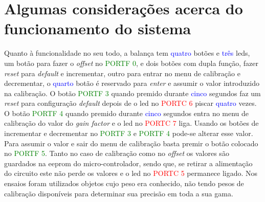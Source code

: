 \section{Algumas considerações acerca do funcionamento do sistema}
Quanto à funcionalidade no seu todo, a balança tem \textcolor{blue}{quatro} botões e \textcolor{blue}{três} \acsp{led}, um botão para fazer o \textit{offset} no \textcolor{green}{PORTF 0}, e dois botões com dupla função, fazer \textit{reset} para \textit{default} e incrementar, outro para entrar no menu de calibração e decrementar, o \textcolor{blue}{quarto} botão é reservado para \textit{enter} e assumir o valor introduzido na calibração.
\emptyline
O botão \textcolor{green}{PORTF 3} quando premido durante \textcolor{blue}{cinco} segundos faz um \textit{reset} para configuração \textit{default} depois de o \acs{led} no \textcolor{red}{PORTC 6} piscar \textcolor{blue}{quatro} vezes.
\emptyline
O botão \textcolor{green}{PORTF 4} quando premido durante \textcolor{blue}{cinco} segundos entra no menu de calibração do valor do \textit{gain factor} e o \acs{led} no \textcolor{red}{PORTC 7} liga. Usando os botões de incrementar e decrementar no
\textcolor{green}{PORTF 3} e \textcolor{green}{PORTF 4} pode-se alterar esse valor.
\emptyline
Para assumir o valor e sair do menu de calibração basta premir o botão colocado no \textcolor{green}{PORTF 5}. Tanto no caso de calibração como no \textit{offset} os valores são guardados na \acs{eeprom} do micro-controlador, sendo que, se retirar a alimentação do circuito este não perde os valores e o \acs{led} no \textcolor{red}{PORTC 5} permanece ligado.
\emptyline
Nos ensaios foram utilizados objetos cujo peso era conhecido, não tendo pesos de calibração disponíveis para determinar sua precisão em toda a sua gama.
\begin{comment}
Sem contar com as despesas no equipamento para a programação do hardware que em principio só se gasta uma vez, isto é, se não se estragar. No caso do programador \textbf{Atmel-ICE} pode custar até \EUR{185.55}.
\emptyline
É de ter em conta que os preços são \textbf{PVP}, que no caso se for preços comerciais são dez vezes inferior, e se for para produção em grande escala também tem descontos por quantidade.\\
$\begin{array}{l l l}
\text{Média} & & \\
\overline{x} & = & \frac{1}{n}\sum_{i=1}^n x_i
\end{array}$
MEMS devices and structures are fabricated using conventional integrated circuit process techniques, such as lithography, deposition, and etching, together with a broad range of specially developed micromachining techniques. \cite{book-9}\\
The three essential elements in conventional silicon processing are deposition, lithography, and etching. \cite{book-9}\\
Sensitivity, Long-Term Drift and Temperature Effects (Span temperature hysteresis).
\end{comment}
